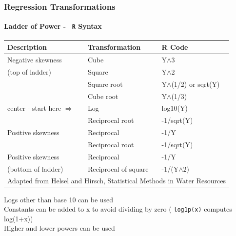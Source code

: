 \documentclass[10pt]{beamer}
\begin{document}
\begin{frame}
\frametitle{Regression Transformations}
\framesubtitle{Ladder of Power - {\tt \color{red} R} Syntax}

\begin{center}
\begin{tabular}{|l|l|l|} \hline
Description                     & Transformation        & {\color{red}R Code} \\ \hline
Negative skewness               & Cube                  & {\color{red}Y$\wedge$3}\\
(top of ladder)                 & Square                & {\color{red}Y$\wedge$2}\\
                                & Square root           & {\color{red}Y$\wedge$(1/2)} or {\color{red}sqrt(Y)}\\
                                & Cube root             & {\color{red}Y$\wedge$(1/3)} \\
{\color{blue} center  - start here $\Rightarrow$}  & Log               & {\color{red}log10(Y)}\\
                                & Reciprocal root       & {\color{red}-1/sqrt(Y)}\\
Positive skewness               & Reciprocal            & {\color{red}-1/Y}\\
                                & Reciprocal root       & {\color{red}-1/sqrt(Y)}\\
Positive skewness               & Reciprocal            & {\color{red}-1/Y}\\
(bottom of ladder)              & Reciprocal of square  & {\color{red}-1/(Y$\wedge2$)}\\ \hline
\multicolumn{3}{l}{{\tiny Adapted from Helsel and Hirsch, Statistical Methods in Water Resources}}\\
\end{tabular}
\end{center}


{\footnotesize
Logs other than base 10 can be used\\
Constants can be added to x to avoid dividing by zero ({\color{red} \tt log1p(x)} computes log(1+x))\\
Higher and lower powers can be used\\
}

\end{frame}
\end{document}
